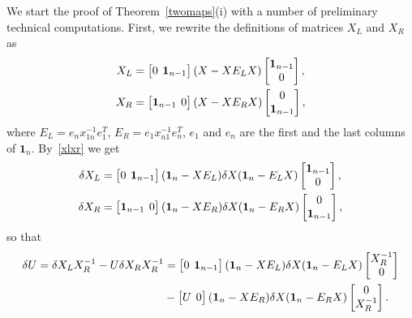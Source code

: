 \documentclass{amsart}
\theoremstyle{definition}
\theoremstyle{remark}
\numberwithin{equation}{section}
\numberwithin{theorem}{section}
\def\nar{\setlength\arraycolsep{2pt}}
\def\one{\mathbf 1}
\begin{document}
We start the proof of Theorem~\ref{twomaps}(i) with a number of preliminary technical computations. First, we rewrite the definitions of
matrices $X_L$ and $X_R$ as
\begin{equation}\label{xlxr}
\begin{aligned}
X_L&=\nar\begin{bmatrix}0&\one_{n-1}\end{bmatrix}(X-XE_LX)\begin{bmatrix} \one_{n-1}\cr 0\end{bmatrix},\\
X_R&=\nar\begin{bmatrix}\one_{n-1}& 0\end{bmatrix}(X-XE_RX)\begin{bmatrix} 0\cr \one_{n-1}\end{bmatrix},
\end{aligned}
\end{equation}
where $E_L=e_nx_{1n}^{-1}e_1^T$, $E_R=e_1x_{n1}^{-1}e_n^T$,
$e_1$ and $e_n$ are the first and the last columns of $\one_n$. 
 By~\eqref{xlxr} we get
\[
\begin{aligned}
\delta X_L&=\nar\begin{bmatrix} 0 &\one_{n-1}\end{bmatrix}(\one_n-XE_L)\delta X(\one_n-E_LX)
\begin{bmatrix} \one_{n-1}\cr0\end{bmatrix},\\
\delta X_R&=\nar\begin{bmatrix} \one_{n-1} &0\end{bmatrix}(\one_n-XE_R)\delta X(\one_n-E_RX)
\begin{bmatrix}0\cr \one_{n-1}\end{bmatrix},
\end{aligned}
\]
so that
\[
\begin{aligned}
\delta U=\delta X_L X_R^{-1}-U\delta X_R X_R^{-1}&
=\nar\begin{bmatrix} 0 &\one_{n-1}\end{bmatrix}(\one_n-XE_L)\delta X(\one_n-E_LX)
\begin{bmatrix} X_R^{-1}\cr0\end{bmatrix}\\
&-\nar\begin{bmatrix} U &0\end{bmatrix}(\one_n-XE_R)\delta X(\one_n-E_RX)
\begin{bmatrix}0\cr X_R^{-1}\end{bmatrix}.
\end{aligned}
\]
\end{document}
